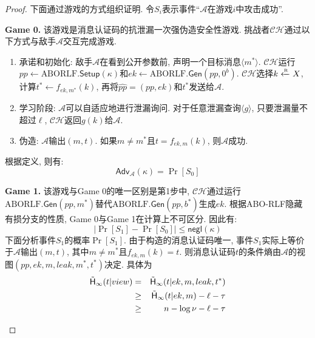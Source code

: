 \begin{proof}
下面通过游戏的方式组织证明. 令$S_i$表示事件``$\mathcal{A}$在游戏$i$中攻击成功''. 
\begin{trivlist}
\item \textbf{Game 0.} 该游戏是消息认证码的抗泄漏一次强伪造安全性游戏. 
    挑战者$\mathcal{CH}$通过以下方式与敌手$\mathcal{A}$交互完成游戏. 
\begin{enumerate} \itemsep 1pt \parskip 0pt \parsep 0pt
\item 承诺和初始化: 敌手$\mathcal{A}$在看到公开参数前, 声明一个目标消息$\langle m^* \rangle$. 
    $\mathcal{CH}$运行$pp \leftarrow \text{ABORLF}.\mathsf{Setup}(\kappa)$和$ek \leftarrow \text{ABORLF}.\mathsf{Gen}(pp, 0^b)$. $\mathcal{CH}$选择$k \xleftarrow{\textup{\tiny R}} X$, 计算$t^* \leftarrow f_{ek,m^*}(k)$, 再将$\hat{pp} = (pp, ek)$和$t^*$发送给$\mathcal{A}$. 

\item 学习阶段: $\mathcal{A}$可以自适应地进行泄漏询问. 对于任意泄漏查询$\langle g \rangle$, 只要泄漏量不超过$\ell$, $\mathcal{CH}$返回$g(k)$给$\mathcal{A}$.   

\item 伪造: $\mathcal{A}$输出$(m, t)$. 如果$m \neq m^*$且$t = f_{ek,m}(k)$, 则$\mathcal{A}$成功. 
\end{enumerate}
根据定义, 则有: 
\begin{equation*}
    \mathsf{Adv}_\mathcal{A}(\kappa) = \Pr[S_0]
\end{equation*}

\item \textbf{Game 1.} 该游戏与Game 0的唯一区别是第1步中, $\mathcal{CH}$通过运行$\text{ABORLF}.\mathsf{Gen}(pp, m^*)$替代$\text{ABORLF}.\mathsf{Gen}(pp, b^*)$生成$ek$.  
    根据ABO-RLF隐藏有损分支的性质, Game 0与Game 1在计算上不可区分. 因此有: 
\begin{equation*}
    |\Pr[S_1] - \Pr[S_0]| \leq \mathsf{negl}(\kappa)
\end{equation*}
下面分析事件$S_1$的概率$\Pr[S_1]$. 由于构造的消息认证码唯一, 事件$S_1$实际上等价于$\mathcal{A}$输出$(m, t)$, 其中$m \neq m^*$且$f_{ek, m}(k) = t$.  则消息认证码$t$的条件熵由$\mathcal{A}$的视图$(pp, ek, m, leak, m^*, t^*)$决定. 具体为 
\begin{eqnarray}
\tilde{\mathsf{H}}_\infty(t|view) & = & \tilde{\mathsf{H}}_\infty(t|ek, m, leak, t^*) \label{eqn:MAC-1}\\ 
                    & \geq & \tilde{\mathsf{H}}_\infty(t|ek, m) -\ell - \tau \label{eqn:MAC-2} \\  
                    & \geq & n - \log \nu - \ell - \tau \label{eqn:MAC-3} 
\end{eqnarray}


\end{trivlist}
\end{proof}
